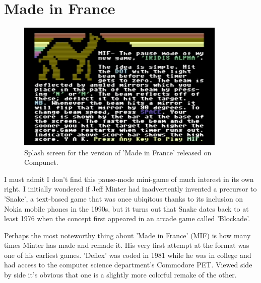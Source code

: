 \chapter{Made in France} 
\label{sec:mif}
\lstset{style=6502Style}
\begin{figure}[H]
    \centering
      \includegraphics[width=10cm]{src/mif/mif.png}%
\caption{Splash screen for the version of 'Made in France' released on Compunet.}
\end{figure}

I must admit I don't find this pause-mode mini-game of much interest in its own right. I initially
wondered if Jeff Minter had inadvertently invented a precursor to 'Snake', a text-based game that
was once ubiqitous thanks to its inclusion on Nokia mobile phones in the 1990s, but it turns out that
Snake dates back to at least 1976 when the concept first appeared in an arcade game called 'Blockade'.

Perhaps the most noteworthy thing about 'Made in France' (MIF) is how many times Minter has made and remade it. His very
first attempt at the format was one of his earliest games. 'Deflex' was coded in 1981 while he was in college and had access to the 
computer science department's Commodore PET. Viewed side by side it's obvious that one is a slightly more colorful
remake of the other.

